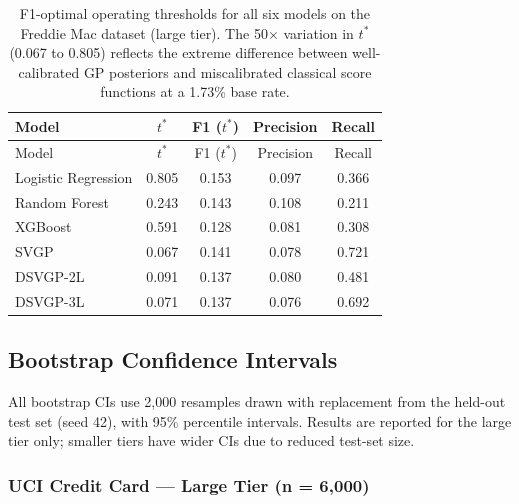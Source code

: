 \documentclass[
  letterpaper,
  DIV=11,
  numbers=noendperiod]{scrartcl}
\begin{document}
\begin{longtable}[]{@{}lcccc@{}}
\caption{F1-optimal operating thresholds for all six models on the
Freddie Mac dataset (large tier). The 50\(\times\) variation in \(t^*\)
(0.067 to 0.805) reflects the extreme difference between well-calibrated
GP posteriors and miscalibrated classical score functions at a 1.73\%
base rate.}\label{tbl-app-fm-threshold-optima}\tabularnewline
\toprule\noalign{}
Model & \(t^*\) & F1 (\(t^*\)) & Precision & Recall \\
\midrule\noalign{}
\endfirsthead
\toprule\noalign{}
Model & \(t^*\) & F1 (\(t^*\)) & Precision & Recall \\
\midrule\noalign{}
\endhead
\bottomrule\noalign{}
\endlastfoot
Logistic Regression & 0.805 & 0.153 & 0.097 & 0.366 \\
Random Forest & 0.243 & 0.143 & 0.108 & 0.211 \\
XGBoost & 0.591 & 0.128 & 0.081 & 0.308 \\
SVGP & 0.067 & 0.141 & 0.078 & 0.721 \\
DSVGP-2L & 0.091 & 0.137 & 0.080 & 0.481 \\
DSVGP-3L & 0.071 & 0.137 & 0.076 & 0.692 \\
\end{longtable}

\subsection{Bootstrap Confidence Intervals}\label{sec-appendix-ci}

All bootstrap CIs use 2,000 resamples drawn with replacement from the
held-out test set (seed 42), with 95\% percentile intervals. Results are
reported for the large tier only; smaller tiers have wider CIs due to
reduced test-set size.

\subsubsection{UCI Credit Card --- Large Tier (n =
6,000)}\label{sec-appendix-uci-ci}
\end{document}

